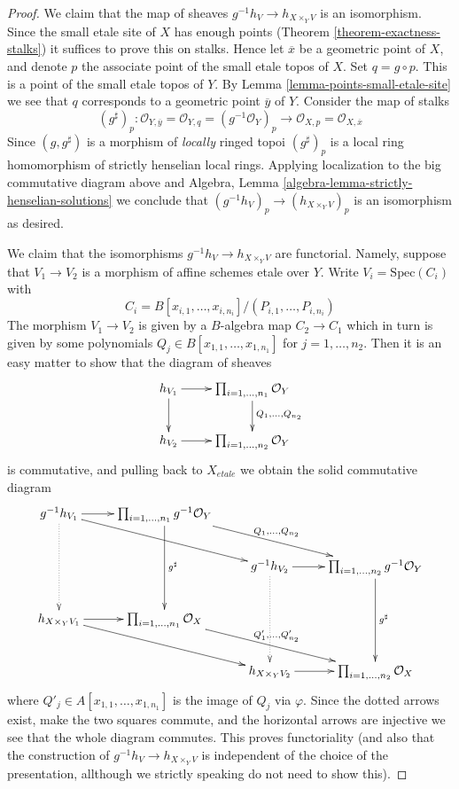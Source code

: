 \begin{proof}
\medskip\noindent
We claim that the map of sheaves $g^{-1}h_V \to h_{X \times_Y V}$
is an isomorphism. Since the small etale site of $X$ has enough points
(Theorem \ref{theorem-exactness-stalks})
it suffices to prove this on stalks. Hence let $\overline{x}$ be a
geometric point of $X$, and denote $p$ the associate point of the
small etale topos of $X$. Set $q = g \circ p$. This is a point of
the small etale topos of $Y$. By
Lemma \ref{lemma-points-small-etale-site}
we see that $q$ corresponds to a geometric point $\overline{y}$ of
$Y$. Consider the map of stalks
$$
(g^\sharp)_p :
\mathcal{O}_{Y, \overline{y}} =
\mathcal{O}_{Y, q} =
(g^{-1}\mathcal{O}_Y)_p
\longrightarrow
\mathcal{O}_{X, p} =
\mathcal{O}_{X, \overline{x}}
$$
Since $(g, g^\sharp)$ is a morphism of {\it locally} ringed topoi
$(g^\sharp)_p$ is a local ring homomorphism of strictly henselian
local rings. Applying localization to the big commutative diagram above and
Algebra, Lemma \ref{algebra-lemma-strictly-henselian-solutions}
we conclude that $(g^{-1}h_V)_p \to (h_{X \times_Y V})_p$ is an isomorphism
as desired.

\medskip\noindent
We claim that the isomorphisms $g^{-1}h_V \to h_{X \times_Y V}$ are
functorial. Namely, suppose that $V_1 \to V_2$ is a morphism of affine
schemes etale over $Y$. Write
$V_i = \text{Spec}(C_i)$ with
$$
C_i = B[x_{i, 1}, \ldots, x_{i, n_i}]/(P_{i, 1}, \ldots, P_{i, n_i})
$$
The morphism $V_1 \to V_2$ is given by a $B$-algebra map $C_2 \to C_1$
which in turn is given by some polynomials
$Q_j \in B[x_{1, 1}, \ldots, x_{1, n_1}]$ for $j = 1, \ldots, n_2$.
Then it is an easy matter to show that the diagram of sheaves
$$
\xymatrix{
h_{V_1} \ar[d] \ar[r] & \prod_{i = 1, \ldots, n_1} \mathcal{O}_Y
\ar[d]^{Q_1, \ldots, Q_{n_2}}\\
h_{V_2} \ar[r] & \prod_{i = 1, \ldots, n_2} \mathcal{O}_Y
}
$$
is commutative, and pulling back to $X_{etale}$ we obtain the
solid commutative diagram
$$
\xymatrix{
g^{-1}h_{V_1} \ar@{..>}[dd] \ar[rrd] \ar[r] &
\prod_{i = 1, \ldots, n_1} g^{-1}\mathcal{O}_Y
\ar[dd]^{g^\sharp}
\ar[rrd]^{Q_1, \ldots, Q_{n_2}} \\
& & g^{-1}h_{V_2} \ar@{..>}[dd] \ar[r] &
\prod_{i = 1, \ldots, n_2} g^{-1}\mathcal{O}_Y
\ar[dd]^{g^\sharp} \\
h_{X \times_Y V_1} \ar[r] \ar[rrd] &
\prod\nolimits_{i = 1, \ldots, n_1} \mathcal{O}_X
\ar[rrd]^{Q'_1, \ldots, Q'_{n_2}} \\
& & h_{X \times_Y V_2} \ar[r] &
\prod\nolimits_{i = 1, \ldots, n_2} \mathcal{O}_X
}
$$
where $Q'_j \in A[x_{1, 1}, \ldots, x_{1, n_1}]$ is the image of
$Q_j$ via $\varphi$. Since the dotted arrows exist, make the
two squares commute, and the horizontal arrows are injective
we see that the whole diagram commutes. This proves functoriality
(and also that the construction of $g^{-1}h_V \to h_{X \times_Y V}$
is independent of the choice of the presentation, allthough we
strictly speaking do not need to show this).


\end{proof}
